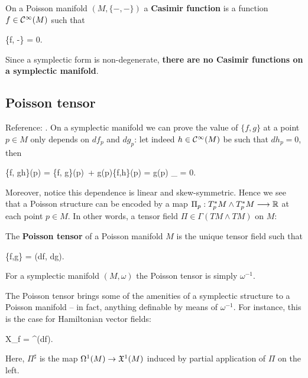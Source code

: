 \documentclass[main.tex]{subfiles}
\begin{document}
\begin{definition}
	On a Poisson manifold $(M, \{-,-\})$ a \textbf{Casimir function} is a function $f \in \mathcal{C}^\infty(M)$ such that
	\begin{eqalign}
		\{f, -\} = 0.
	\end{eqalign}
\end{definition}

\begin{remark}
	Since a symplectic form is non-degenerate, \textbf{there are no Casimir functions on a symplectic manifold}.
\end{remark}

\subsection{Poisson tensor}
Reference: \cite{fernandes2014lectures}. On a symplectic manifold we can prove the value of $\{f,g\}$ at a point $p \in M$ only depends on $df_p$ and $dg_p$: let indeed $h \in \mathcal{C}^\infty(M)$ be such that $dh_p = 0$, then
\begin{eqalign}
	\{f, gh\}(p) = \{f, g\}(p)\, + g(p)\{f,h\}(p) = g(p) _{} = 0.
\end{eqalign}
Moreover, notice this dependence is linear and skew-symmetric. Hence we see that a Poisson structure can be encoded by a map $\Pi_p : T^*_pM \wedge T^*_pM \longrightarrow \mathbb{R}$ at each point $p \in M$. In other words, a tensor field $\Pi \in \Gamma(TM \wedge TM)$ on $M$:

\begin{definition}
	The \textbf{Poisson tensor} of a Poisson manifold $M$ is the unique tensor field such that
	\begin{eqalign}
		\{f,g\} = \Pi(df, dg).
	\end{eqalign}
\end{definition}

\begin{example}
	For a symplectic manifold $(M, \omega)$ the Poisson tensor is simply $\omega^{-1}$.
\end{example}

The Poisson tensor brings some of the amenities of a symplectic structure to a Poisson manifold -- in fact, anything definable by means of $\omega^{-1}$. For instance, this is the case for Hamiltonian vector fields:
\begin{eqalign}
\label{eq:ham_vf_from_pi}
	X_f = \Pi^\sharp(df).
\end{eqalign}
Here, $\Pi^\sharp$ is the map $\Omega^1(M) \to \mathfrak{X}^1(M)$ induced by partial application of $\Pi$ on the left.
\end{document}
